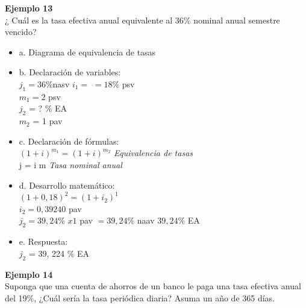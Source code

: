 \textbf{Ejemplo 13}\\

¿ Cuál es la tasa efectiva anual equivalente al 36\% nominal anual semestre vencido?\\

\begin{itemize}
    \item a. Diagrama de equivalencia de tasas\\
    
	\item b. Declaración de variables:\\
	$j_{1} = 36$\%nasv \Rightarrow $i_{1} =$ $= 18$\% psv \\
	$m_{1} = 2$ psv\\
	
   
    $j_{2}$ = ? \% EA \\
    $m_{2}$ = 1 pav \\
	
	\item c. Declaración de fórmulas:\\
	$(1+i)^{m_1} = (1+i)^{m_2}$ \hspace{35 pt} \textit{Equivalencia de tasas}\\
	j = i m \hspace{35 pt} \textit             {Tasa nominal anual}\\
	
	\item d. Desarrollo matemático:\\
	
		$(1+0,18)^{2} = (1+i_{2})^{1}$ \\
		$i_{2} = 0,39240$  pav\\
		$j_{2} = 39,24$\% $x1$ pav $= 39,24$\% naav \equiv $39,24$\% EA
	
	\item e. Respuesta:\\
	
	$j_{2}$ = 39, 224 \% EA\\
	
\end{itemize}


\textbf{Ejemplo 14}\\

Suponga que una cuenta de ahorros de un banco le paga una tasa efectiva anual del 19\%, ¿Cuál sería la tasa periódica diaria? Asuma un año de 365 días.\\

